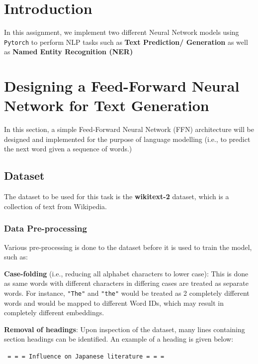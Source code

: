 \documentclass[sigconf,nonacm=true]{acmart}
\begin{document}
\maketitle

\section{Introduction}
In this assignment, we implement two different Neural Network models using \verb|Pytorch| to perform NLP tasks such as \textbf{Text Prediction/ Generation} as well as \textbf{Named Entity Recognition (NER)}

\section{Designing a Feed-Forward Neural Network for Text Generation}
In this section, a simple Feed-Forward Neural Network (FFN) architecture
will be designed and implemented for the purpose of language modelling
(i.e., to predict the next word given a sequence of words.)

\subsection{Dataset}
\label{subsection:dataset}
The dataset to be used for this task is the \textbf{wikitext-2} dataset,
which is a collection of text from Wikipedia.
\subsubsection{Data Pre-processing}
Various pre-processing is done to the dataset before it is used to train the 
model, such as:

\textbf{Case-folding} (i.e., reducing all alphabet characters to lower case): 
This is done as same words with different characters in differing cases are
treated as separate words. For instance, \verb|"The"| and \verb|"the"| would
be treated as 2 completely different words and would be mapped to different 
Word IDs, which may result in completely different embeddings.

\textbf{Removal of headings}: Upon inspection of the dataset, many lines containing
section headings can be identified. An example of a heading is given below:

\verb| = = = Influence on Japanese literature = = = |
\end{document}
